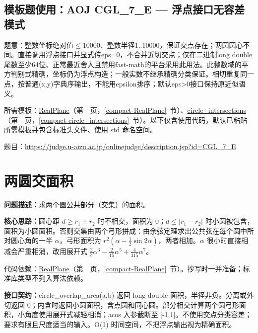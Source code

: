 \Needspace{429pt}

\subsection*{模板题使用：AOJ CGL\_7\_E — 浮点接口无容差模式}

\label{usage-example-230}

题意：整数坐标绝对值$\le$10000、整数半径1..10000，保证交点存在；两圆圆心不同。直接调用浮点接口并显式传eps=0，不合并近切交点；仅在二进制long double尾数至少64位、正常最近舍入且禁用fast-math的平台采用此用法。此整数域的平方判别式精确，坐标仍为浮点构造；一般实数不继承精确分类保证。相切重复同一点，按普通(x,y)字典序输出，不能用epsilon排序；默认eps>0接口保持原近似语义。

所需模板：\hyperref[compact-RealPlane]{RealPlane}（第~\pageref{compact-RealPlane}~页，\ref{compact-RealPlane}~节）、\hyperref[compact-circle_intersections]{circle\_\allowbreak{}intersections}（第~\pageref{compact-circle_intersections}~页，\ref{compact-circle_intersections}~节）。以下仅含使用代码，默认已粘贴所需模板并包含标准头文件、使用 std 命名空间。

题目：\url{https://judge.u-aizu.ac.jp/onlinejudge/description.jsp?id=CGL_7_E}



\Needspace{417pt}

\section{两圆交面积}\label{compact-circle_overlap_area}

\noindent\textbf{问题描述：}\allowbreak 求两个圆公共部分（交集）的面积。

\textbf{核心思路：}\allowbreak 圆心距 $d\ge r_1+r_2$ 时不相交，面积为 0；$d\le|r_1-r_2|$ 时小圆被包含，面积为小圆面积。否则交集由两个弓形拼成：由余弦定理求出公共弦在每个圆中所对圆心角的一半 $\alpha$，弓形面积为 $r^2(\alpha-\frac12\sin2\alpha)$，两者相加。$\alpha$ 很小时直接相减会严重相消，改用展开式 $\frac23\alpha^3-\frac2{15}\alpha^5+\frac4{315}\alpha^7$。

代码依赖：\hyperref[compact-RealPlane]{RealPlane}（第~\pageref{compact-RealPlane}~页，\ref{compact-RealPlane}~节）。抄写时一并准备；标准库类型不列入算法依赖。

{\sloppy{}\noindent\textbf{接口契约：}circle\_overlap\_area(a,b) 返回 long double 面积，半径非负。分离或外切返回 0；内含时返回小圆面积，含点圆和同心圆。部分相交计算两个圆弓形面积，小角度使用展开式减轻相消；acos 入参截断至 [-1,1]。不使用交点分类容差；要求有限且尺度适当的输入。O(1) 时间空间，不把浮点输出视为精确面积。\par}

